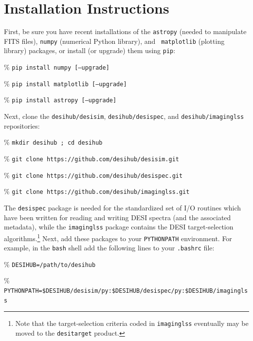 \documentclass[12pt]{article}
\begin{document}


%


\clearpage
\appendix

\section{Installation Instructions}\label{sec:install}

First, be sure you have recent installations of the {\tt astropy} (needed to
manipulate FITS files), {\tt numpy} (numerical Python library), and {\tt
  matplotlib} (plotting library) packages, or install (or upgrade) them using
{\tt pip}:
\begin{itemize*}
  \item[\%]{{\tt pip install numpy [--upgrade]}}
  \item[\%]{{\tt pip install matplotlib [--upgrade]}}
  \item[\%]{{\tt pip install astropy [--upgrade]}}
\end{itemize*}

\noindent Next, clone the {\tt desihub/desisim}, {\tt desihub/desispec}, and
          {\tt desihub/imaginglss} repositories:
\begin{itemize*}
  \item[\%]{{\tt mkdir desihub ; cd desihub}}
  \item[\%]{{\tt git clone https://github.com/desihub/desisim.git}}
  \item[\%]{{\tt git clone https://github.com/desihub/desispec.git}}
  \item[\%]{{\tt git clone https://github.com/desihub/imaginglss.git}}
\end{itemize*}

\noindent The {\tt desispec} package is needed for the standardized set of I/O
routines which have been written for reading and writing DESI spectra (and the
associated metadata), while the {\tt imaginglss} package contains the DESI
target-selection algorithms.\footnote{Note that the target-selection criteria
  coded in {\tt imaginglss} eventually may be moved to the {\tt desitarget}
  product.}  Next, add these packages to your {\tt PYTHONPATH} environment.  For
example, in the {\tt bash} shell add the following lines to your {\tt .bashrc}
file:
\begin{itemize*}
  \item[\%]{{\tt DESIHUB=/path/to/desihub}}
  \item[\%]{{\tt
      PYTHONPATH=\$DESIHUB/desisim/py:\$DESIHUB/desispec/py:\$DESIHUB/imaginglss}}
\end{itemize*}
\end{document}
